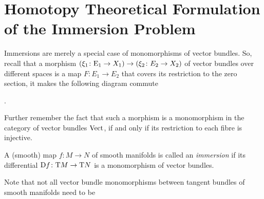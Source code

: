 % 


\chapter{Homotopy Theoretical Formulation of the Immersion Problem}

  
Immersions are merely a special case of monomorphisms of vector
bundles. So, recall that
a morphism $(\xi_1\colon\mathrm{E}_1\to X_1)\to(\xi_2\colon E_2\to X_2)$
of vector bundles over different spaces is a map $F\colon E_1\to E_2$
that covers its restriction to the zero section, \idest it makes the
following diagram commute
\begin{center}
  .
\end{center}
Further remember the fact that such a morphism is a monomorphism in
the category of vector bundles $\mathrm{Vect}$, if and only if its restriction
to each fibre is injective.
\begin{Def}
  A (smooth) map $f\colon M\to N$ of smooth manifolds is called
  an \emph{immersion} if its differential
  $\mathrm{D} f\colon\mathrm{T}M\to\mathrm{T}N$ is a monomorphism of vector
  bundles.
\end{Def}
Note that not all vector bundle monomorphisms between tangent bundles
of smooth manifolds need to be 


